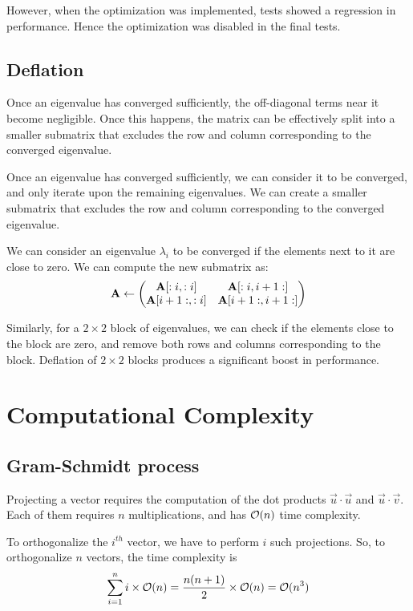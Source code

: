 \documentclass{article}
\begin{document}
However, when the optimization was implemented, tests showed a regression
in performance. Hence the optimization was disabled in the final tests.

\subsection{Deflation}

Once an eigenvalue has converged sufficiently, the off-diagonal terms near it become negligible.
Once this happens, the matrix can be effectively split into a smaller submatrix that excludes
the row and column corresponding to the converged eigenvalue.

Once an eigenvalue has converged sufficiently, we can consider it to be converged,
and only iterate upon the remaining eigenvalues. We can create a smaller submatrix that excludes
the row and column corresponding to the converged eigenvalue.

We can consider an eigenvalue $\lambda_i$ to be converged if the elements next to it are close
to zero. We can compute the new submatrix as:
\begin{align}
    \mathbf{A} \gets \begin{pmatrix}\mathbf{A}[:i, :i] & \mathbf{A}[:i, i+1:] \\ \mathbf{A}[i+1:, :i] & \mathbf{A}[i+1:, i+1:]\end{pmatrix}
\end{align}

Similarly, for a $2 \times 2$ block of eigenvalues, we can check if the elements close
to the block are zero, and remove both rows and columns corresponding to the block. Deflation of
$2 \times 2$ blocks produces a significant boost in performance.

\section{Computational Complexity}

\subsection{Gram-Schmidt process}

Projecting a vector requires the computation of the
dot products $\vec{u} \cdot \vec{u}$ and $\vec{u} \cdot \vec{v}$. Each
of them requires $n$ multiplications, and has $\mathcal{O}(n)$ time complexity.

To orthogonalize the $i^{th}$ vector, we have to perform $i$ such projections.
So, to orthogonalize $n$ vectors, the time complexity is
\begin{align}
    \sum_{i=1}^n i \times \mathcal{O}(n) = \frac{n(n+1)}{2} \times \mathcal{O}(n) = \mathcal{O}(n^3)
\end{align}
\end{document}
